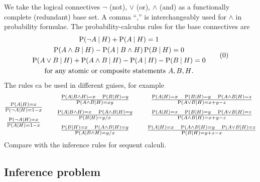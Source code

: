 \documentclass[a4paper,12pt,%
onecolumn,oneside,article,%
british%
]{memoir}
\renewcommand*{\P}{\mathrm{P}}%
\renewcommand*{\|}[1][]{\nonscript\:#1\vert\nonscript\:\mathopen{}}
\newcommand*{\chap}{ch.}%
\newcommand*{\eg}{{e.g.}}
\begin{document}
We take the logical connectives $\lnot$ (not), $\lor$ (or), $\land$ (and) as a functionally complete (redundant) base set. A comma \enquote{,} is interchangeably used for $\land$ in probability formulae. The probability-calculus rules for the base connectives are
\begin{equation}
  \begin{gathered}
\P(\lnot A\|H) + \P(A \|H) = 1
\\
\P(A\land B \|H) - \P(A\|B\land H) \, \P(B\| H)= 0
  \\
  \P(A\lor B \|H) + \P(A\land B \|H) -\P(A\|H)-  \P(B\| H)=0
  \\
  \text{for any atomic or composite statements $A,B,H$.}
\end{gathered}
\tag{0}\label{eq:Prules}
\end{equation}
The rules ca be used in different guises, for example
\begin{equation*}
  \begin{gathered}
    \textstyle
    \frac{\P(A\|H) = x}{\P(\lnot A \|H) = 1-x}
  \\[\jot]
    \textstyle
  \frac{\P(\lnot A\|H) = x}{\P(A \|H) = 1-x}
\end{gathered}\qquad
  \begin{gathered}
  \textstyle
  \frac{\P(A\|B\land H) = x \quad \P(B\| H)=y}{\P(A\land B \|H) = x y}
  \\[\jot]
  \textstyle
 \frac{\P(A\|B\land H) = x \quad \P(A\land B \|H)=y}{\P(B\| H)=y/x}
\\[\jot]
  \textstyle
 \frac{\P(B\| H) = x \quad \P(A\land B \|H)=y}{\P(A\| B\land H)=y/x}
\end{gathered}\qquad
  \begin{gathered}
\textstyle
  \frac{\P(A\|H) = x \quad \P(B\| H)=y \quad
  \P(A\land B \|H)=z}{\P(A\lor B \|H) = x+y-z}
\\[\jot]
\textstyle
  \frac{\P(A\|H) = x \quad \P(B\| H)=y \quad
  \P(A\lor B \|H)=z}{\P(A\land B \|H) = x+y-z}
\\[\jot]
\textstyle
  \frac{\P(A\|H) = x \quad \P(A\land B \|H) = y\quad 
  \P(A\lor B \|H)=z }{\P(B\| H)=y+z-x}
\end{gathered}
\end{equation*}
Compare with the inference rules for sequent calculi.\autocites[\eg][\chap~1]{huthetal2000_r2004}[App.~A]{prawitz1965}[see also][]{boricic2020}

\subsection{Inference problem}
\label{sec:inference}
\end{document}

